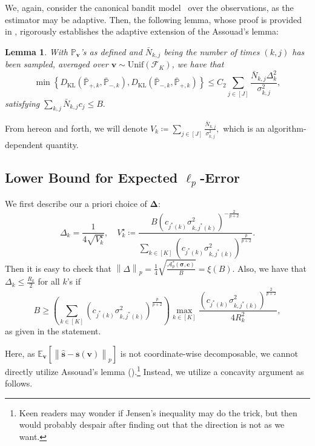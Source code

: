 \documentclass{article}
\def\vc{{\bm{c}}}
\def\vs{{\bm{s}}}
\def\vv{{\bm{v}}}
\def\gA{{\mathcal{A}}}
\def\gF{{\mathcal{F}}}
\def\sP{{\mathbb{P}}}
\newcommand{\E}{\mathbb{E}}
\newcommand{\KL}{D_{\mathrm{KL}}}
\theoremstyle{plain}
\newtheorem{lemma}[theorem]{Lemma}
\theoremstyle{definition}
\theoremstyle{plain}
\newcommand{\bignorm}[1]{\left\lVert #1 \right\rVert}
\begin{document}
We, again, consider the canonical bandit model~\citep[Section 4.6]{banditalgorithms} over the observations, as the estimator may be adaptive.
Then, the following lemma, whose proof is provided in , rigorously establishes the adaptive extension of the Assouad's lemma:
\begin{lemma}
\label{lem:assouad-adaptive}
    With $\sP_\vv$'s as defined and $\bar{N}_{k,j}$ being the number of times $(k, j)$ has been sampled, averaged over $\vv \sim \mathrm{Unif}(\gF_K)$, we have that
    \begin{equation}
        \min\left\{ \KL(\bar{\sP}_{+,k}, \bar{\sP}_{-,k}), \KL(\bar{\sP}_{-,k}, \bar{\sP}_{+,k}) \right\} \leq C_2 \sum_{j \in [J]} \frac{\bar{N}_{k,j} \Delta_k^2}{\sigma_{k,j}^2},
    \end{equation}
    satisfying $\sum_{k,j} \bar{N}_{k,j} c_j \leq B.$
\end{lemma}
From hereon and forth, we will denote $V_k \coloneq \sum_{j \in [J]} \frac{\bar{N}_{k,j}}{\sigma_{k,j}^2},$ which is an algorithm-dependent quantity.


\subsection{\texorpdfstring{Lower Bound for Expected $\ell_p$-Error}{Lower Bound for Expected Lp-Error}}
We first describe our a priori choice of $\bm\Delta$:
\begin{equation}
    \Delta_k = \frac{1}{4 \sqrt{V_k^\star}}, \quad
    V_k^\star \coloneq \frac{B \left( c_{j^*(k)} \sigma_{k,j^*(k)}^2 \right)^{-\frac{2}{p+2}}}{\sum_{k \in [K]} \left( c_{j^*(k)} \sigma_{k,j^*(k)}^2 \right)^{\frac{p}{p+2}}}.
\end{equation}
Then it is easy to check that $\bignorm{\Delta}_p = \frac{1}{4} \sqrt{\frac{\gA_p^*(\bm\sigma, \vc)}{B}} = \xi(B)$.
Also, we have that $\Delta_k \leq \frac{R_k}{2}$ for all $k$'s if
\begin{equation}
    B \geq \left( \sum_{k \in [K]} \left( c_{j^*(k)} \sigma_{k,j^*(k)}^2 \right)^{\frac{p}{p+2}} \right) \max_{k \in [K]} \frac{\left( c_{j^*(k)} \sigma_{k,j^*(k)}^2 \right)^{\frac{2}{p+2}}}{4 R_k^2},
\end{equation}
as given in the statement.



Here, as $\E_{\vv}\left[ \bignorm{\hat{\vs} - \vs(\vv)}_p \right]$ is not coordinate-wise decomposable, we cannot directly utilize Assouad's lemma ().\footnote{Keen readers may wonder if Jensen's inequality may do the trick, but then would probably despair after finding out that the direction is not as we want.}
Instead, we utilize a concavity argument as follows.
\end{document}
